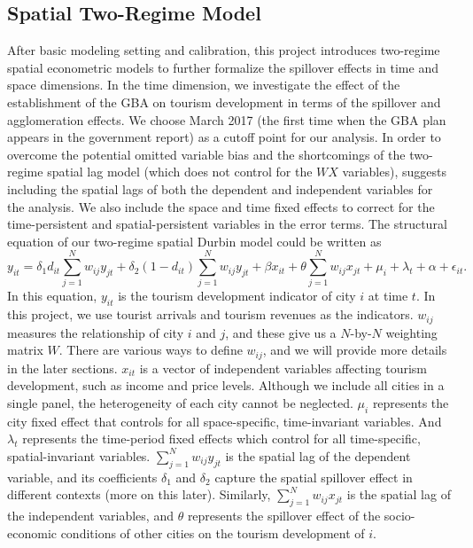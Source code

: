 \documentclass[11pt,a4paper]{amsart}
\theoremstyle{plain}
\theoremstyle{definition}
\begin{document}
\subsection{Spatial Two-Regime Model}\hfill\par 
\noindent After basic modeling setting and calibration, this project introduces two-regime spatial econometric models to further formalize the spillover effects in time and space dimensions. In the time dimension, we investigate the effect of the establishment of the GBA on tourism development in terms of the spillover and agglomeration effects. We choose March 2017 (the first time when the GBA plan appears in the government report) as a cutoff point for our analysis. In order to overcome the potential omitted variable bias and the shortcomings of the two-regime spatial lag model (which does not control for the $WX$ variables), \textcite{elhorstEvidencePoliticalYardstick2009} suggests including the spatial lags of both the dependent and independent variables for the analysis. We also include the space and time fixed effects to correct for the time-persistent and spatial-persistent variables in the error terms. The structural equation of our two-regime spatial Durbin model could be written as  \parencite{wangStrategicInteractionIndustrial2020}
\[	y_{it} = \delta_{1}d_{it}\sum_{j = 1}^{N}w_{ij}y_{jt} + \delta_{2}(1-d_{it})\sum_{j = 1}^{N}w_{ij}y_{jt} + \beta x_{it} + \theta \sum_{j = 1}^{N}w_{ij}x_{jt} + \mu_{i} + \lambda_{t} + \alpha + \epsilon_{it}.	\]
In this equation, $y_{it}$ is the tourism development indicator of city $i$ at time $t$. In this project, we use tourist arrivals and tourism revenues as the indicators. $w_{ij}$ measures the relationship of city $i$ and $j$, and these give us a $N$-by-$N$ weighting matrix $W$. There are various ways to define $w_{ij}$, and we will provide more details in the later sections. $x_{it}$ is a vector of independent variables affecting tourism development, such as income and price levels. Although we include all cities in a single panel, the heterogeneity of each city cannot be neglected. $\mu_{i}$ represents the city fixed effect that controls for all space-specific, time-invariant variables. And $\lambda_{t}$ represents the time-period fixed effects which control for all time-specific, spatial-invariant variables. $\sum_{j = 1}^{N}w_{ij}y_{jt}$ is the spatial lag of the dependent variable, and its coefficients $\delta_{1}$ and $\delta_{2}$ capture the spatial spillover effect in different contexts (more on this later). Similarly, $\sum_{j = 1}^{N}w_{ij}x_{jt} $ is the spatial lag of the independent variables, and $\theta$ represents the spillover effect of the socio-economic conditions of other cities on the tourism development of $i$. 
\end{document}
